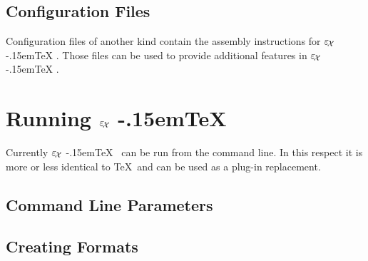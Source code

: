 \documentclass[12pt,div12,a4paper]{scrbook}
\providecommand*{\ExTeX}{\ifx\texorpdfstring\undefined
  \textrm{%
    \ensuremath{\textstyle\varepsilon_{\kern-0.15em\mathcal{X}}}%
    \kern-.15em\TeX}%
  \else\texorpdfstring{%
  \textrm{%
    \ensuremath{\textstyle\varepsilon_{\kern-0.15em\mathcal{X}}}%
    \kern-.15em\TeX
  }}{ExTeX}%
  \fi
}
\begin{document}
\section{Configuration Files}

Configuration files of another kind contain the assembly instructions
for \ExTeX. Those files can be used to provide additional features in
\ExTeX. 


\chapter{Running \ExTeX}

Currently \ExTeX\ can be run from the command line. In this respect it
is more or less identical to \TeX\ and can be used as a plug-in
replacement.

\section{Command Line Parameters}



\section{Creating Formats}
\end{document}
